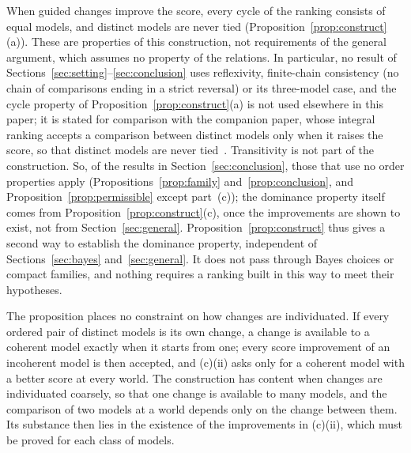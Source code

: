 \documentclass[11pt]{article}
\theoremstyle{definition}
\theoremstyle{remark}
\begin{document}
When guided changes improve the score, every cycle of the ranking consists of equal models, and distinct models are never tied (Proposition~\ref{prop:construct}(a)). These are properties of this construction, not requirements of the general argument, which assumes no property of the relations. In particular, no result of Sections~\ref{sec:setting}--\ref{sec:conclusion} uses reflexivity, finite-chain consistency (no chain of comparisons ending in a strict reversal) or its three-model case, and the cycle property of Proposition~\ref{prop:construct}(a) is not used elsewhere in this paper; it is stated for comparison with the companion paper, whose integral ranking accepts a comparison between distinct models only when it raises the score, so that distinct models are never tied~\cite[Lemma~5.3(b)]{KCM}. Transitivity is not part of the construction. So, of the results in Section~\ref{sec:conclusion}, those that use no order properties apply (Propositions~\ref{prop:family} and~\ref{prop:conclusion}, and Proposition~\ref{prop:permissible} except part~(c)); the dominance property itself comes from Proposition~\ref{prop:construct}(c), once the improvements are shown to exist, not from Section~\ref{sec:general}. Proposition~\ref{prop:construct} thus gives a second way to establish the dominance property, independent of Sections~\ref{sec:bayes} and~\ref{sec:general}. It does not pass through Bayes choices or compact families, and nothing requires a ranking built in this way to meet their hypotheses.

The proposition places no constraint on how changes are individuated. If every ordered pair of distinct models is its own change, a change is available to a coherent model exactly when it starts from one; every score improvement of an incoherent model is then accepted, and (c)(ii) asks only for a coherent model with a better score at every world. The construction has content when changes are individuated coarsely, so that one change is available to many models, and the comparison of two models at a world depends only on the change between them. Its substance then lies in the existence of the improvements in (c)(ii), which must be proved for each class of models.
\end{document}
